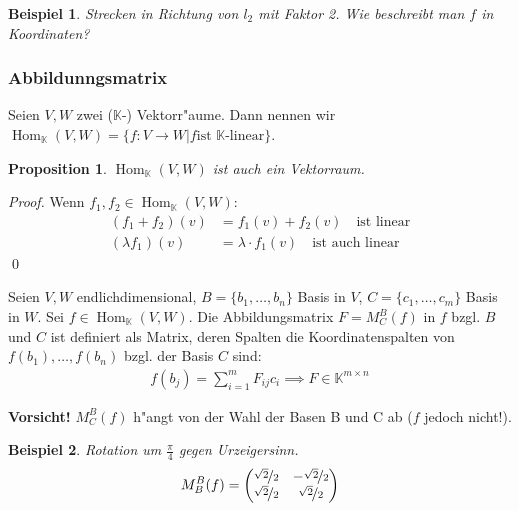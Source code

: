 \documentclass[11pt]{article}
\DeclareMathOperator{\mHom}{Hom}
\newtheorem{exa}{Beispiel}[section]
\newtheorem*{proposition}{Proposition}
\begin{document}
\begin{exa}
Strecken in Richtung von \(l_2\) mit Faktor 2. Wie beschreibt man \(f\) in
Koordinaten?
\end{exa}

\subsubsection{Abbildunngsmatrix}
\begin{definition}{}{}
Seien \(V,W\) zwei (\(\mathbb{K}\)-) Vektorr"aume. Dann nennen wir
\(\mHom_\mathbb{K}(V,W) = \{f: V\to W | f \text{ist }\mathbb{K}\text{-linear}\}\).
\end{definition}
\begin{proposition}
\(\mHom_\mathbb{K}(V,W)\) ist auch ein Vektorraum.
\end{proposition}
\begin{proof}
Wenn \(f_1, f_2 \in \mHom_\mathbb{K}(V,W)\):
\begin{align*}
(f_1 + f_2)(v) &= f_1(v) + f_2(v) \quad\text{ist linear} \\
(\lambda f_1)(v) &= \lambda\cdot f_1(v)\quad\text{ist auch linear}
\end{align*}
\qed
\end{proof}

Seien \(V, W\) endlichdimensional, \(B = \{b_1, \dots, b_n\}\) Basis in \(V\), \(C = \{c_1, \dots, c_m\}\) Basis in \(W\). Sei \(f \in \mHom_\mathbb{K}(V,W)\). Die Abbildungsmatrix \(F= M_C^B(f)\) in \(f\) bzgl. \(B\) und \(C\) ist definiert als
Matrix, deren Spalten die Koordinatenspalten von \(f(b_1),\dots, f(b_n)\) bzgl. der Basis \(C\) sind:
\begin{align*}
f(b_j) = \sum_{i=1}^mF_{ij}c_i \implies F \in \mathbb{K}^{m\times n}
\end{align*}

\textbf{Vorsicht!} \(M_C^B(f)\) h"angt von der Wahl der Basen B und C ab (\(f\) jedoch nicht!).

\begin{exa}
Rotation um \(\frac{\pi}{4}\) gegen Urzeigersinn.
\begin{align*}
M_B^B(f) = \begin{pmatrix}
\nicefrac{\sqrt{2}}{2} & -\nicefrac{\sqrt{2}}{2}\\
\nicefrac{\sqrt{2}}{2} & \nicefrac{\sqrt{2}}{2}
\end{pmatrix}
\end{align*}
\end{exa}
\end{document}
